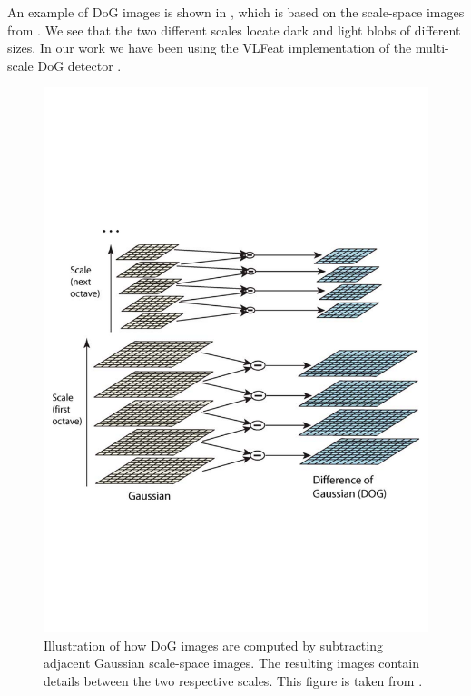 \documentclass[thesis.tex]{subfiles}
\begin{document}
An example of DoG images is shown in , which is based on the scale-space images from . We see that the two different scales locate dark and light blobs of different sizes. In our work we have been using the VLFeat implementation of the multi-scale DoG detector \citet{vedaldi2008vlfeat}.
%
\begin{figure}[p]
	\centering
	\includegraphics[width=\textwidth,clip=true,trim=0 200 0 220]{img/SIFT_dogspaces.pdf}
	\caption{Illustration of how DoG images are computed by subtracting adjacent Gaussian scale-space images. The resulting images contain details between the two respective scales. This figure is taken from \citet[figure 1,pp. 95]{lowe2004distinctive}.}
	\label{fig:dogSpaces}
	\vspace{5mm}


\end{figure}
\end{document}
